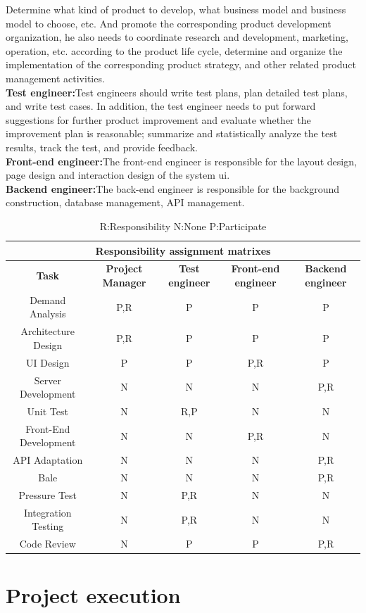 \documentclass[runningheads]{llncs}
\begin{document}
Determine what kind of product to develop, what business model and business model to choose, etc. And promote the corresponding product development organization, he also needs to coordinate research and development, marketing, operation, etc. according to the product life cycle, determine and organize the implementation of the corresponding product strategy, and other related product management activities.\\
\textbf{Test engineer:}Test engineers should write test plans, plan detailed test plans, and write test cases. In addition, the test engineer needs to put forward suggestions for further product improvement and evaluate whether the improvement plan is reasonable; summarize and statistically analyze the test results, track the test, and provide feedback.\\
\textbf{Front-end engineer:}The front-end engineer is responsible for the layout design, page design and interaction design of the system ui.\\
\textbf{Backend engineer:}The back-end engineer is responsible for the background construction, database management, API management.
\begin{table}
\centering
\begin{tabular}{|c|c|c|c|c|}
\hline
\multicolumn{5}{|c|}{\textbf{Responsibility assignment matrixes}}\\ %
\hline
\textbf{Task}&\textbf{Project Manager}&\textbf{Test engineer}&\textbf{Front-end engineer}&\textbf{Backend engineer}\\
\hline
Demand Analysis&P,R&P&P&P\\
\hline
Architecture Design&P,R&P&P&P\\
\hline
UI Design&P&P&P,R&P\\
\hline
Server Development&N&N&N&P,R\\
\hline
Unit Test&N&R,P&N&N\\
\hline
Front-End Development&N&N&P,R&N\\
\hline
API Adaptation&N&N&N&P,R\\
\hline
Bale&N&N&N&P,R\\
\hline
Pressure Test&N&P,R&N&N\\
\hline
Integration Testing&N&P,R&N&N\\
\hline
Code Review&N&P&P&P,R\\
\hline

\end{tabular}
\caption{R:Responsibility  N:None  P:Participate}
\end{table}

\section{Project execution}
\end{document}
